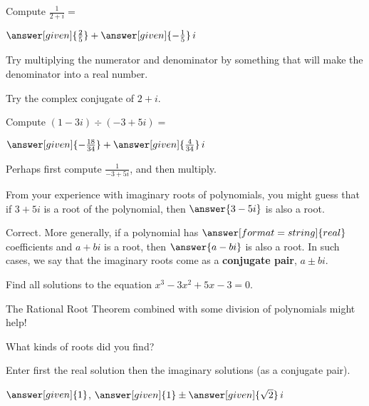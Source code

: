 \documentclass[nooutcomes]{ximera}
\begin{document}
\begin{problem}
Compute $\frac{1}{2+i}=$
\begin{prompt}
	$\answer[given]{\frac{2}{5}} + \answer[given]{-\frac{1}{5}}\,i$
\end{prompt}
\begin{hint}
Try multiplying the numerator and denominator by something that will make the denominator into a real number.  
\end{hint}
\begin{hint}
Try the complex conjugate of $2+i$.
\end{hint}
\end{problem}



\begin{problem}
Compute $(1-3i) \div (-3+5i)=$
\begin{prompt}
	$\answer[given]{-\frac{18}{34}} + \answer[given]{\frac{4}{34}}\,i$
\end{prompt}
\begin{hint}
Perhaps first compute $\frac{1}{-3+5i}$, and then multiply.
\end{hint}
\end{problem}

\begin{problem}
From your experience with imaginary roots of polynomials, you might guess that if $3+5i$ is a root of the polynomial, then $\answer{3-5i}$ is also a root.    
\begin{problem}
Correct.  More generally, if a polynomial has $\answer[format=string]{real}$ coefficients and $a+bi$ is a root, then $\answer{a-bi}$ is also a root.  In such cases, we say that the imaginary roots come as a \textbf{conjugate pair}, $a\pm bi$.  

\end{problem}
\end{problem}


\begin{problem}
Find all solutions to the equation $x^3-3x^2+5x-3=0$. 
\begin{hint} 
The Rational Root Theorem combined with some division of polynomials might help!
\end{hint}
What kinds of roots did you find? 
\begin{multipleChoice}
\end{multipleChoice}
\begin{problem}
Enter first the real solution then the imaginary solutions (as a conjugate pair).

\begin{prompt}
$\answer[given]{1}$, $\answer[given]{1} \pm \answer[given]{\sqrt{2}}\,i$
\end{prompt}
\end{problem}
\end{problem}
\end{document}
